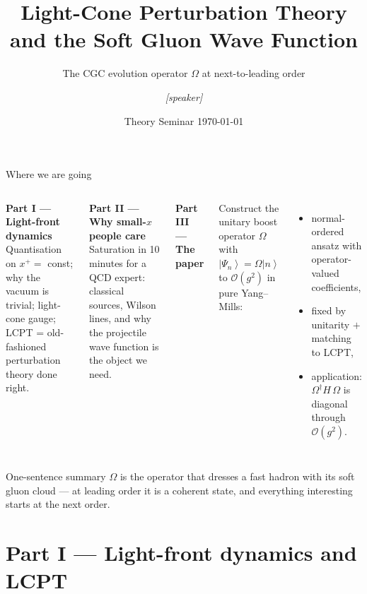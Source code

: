 \documentclass[9pt,aspectratio=169]{beamer}
\title{Light-Cone Perturbation Theory and the Soft Gluon Wave Function}
\subtitle{The CGC evolution operator $\Omega$ at next-to-leading order}
\date{Theory Seminar \quad\textbullet\quad \today}
\author{\textit{[speaker]}}
\institute{based on \textbf{R.~Radhakrishnan}, \texttt{arXiv:2607.18373} (JHEP submission)}
\newcommand{\hl}[1]{\textcolor{acc}{#1}}
\newcommand{\xp}{x^{+}}
\newcommand{\Om}{\Omega}
\newcommand{\ket}[1]{\left|#1\right\rangle}
\begin{document}
\maketitle

\begin{frame}{Where we are going}
\begin{columns}[T,onlytextwidth]
\textbf{Part I --- Light-front dynamics}\\[2pt]
{\small Quantisation on $\xp=$ const; why the vacuum is trivial;
light-cone gauge; \hl{LCPT} = old-fashioned perturbation theory done right.}
\medskip

\textbf{Part II --- Why small-$x$ people care}\\[2pt]
{\small Saturation in 10 minutes for a QCD expert: classical sources,
Wilson lines, and why the \hl{projectile wave function} is the object we need.}

\textbf{Part III --- The paper}\\[2pt]
{\small Construct the unitary boost operator $\Om$ with
$\ket{\Psi_n}=\Om\ket{n}$ to $\mathcal{O}(g^2)$ in pure Yang--Mills:
\begin{itemize}\small
  \item normal-ordered ansatz with \hl{operator-valued} coefficients,
  \item fixed by \hl{unitarity} $+$ \hl{matching to LCPT},
  \item application: $\Om^\dagger H\,\Om$ is diagonal through $\mathcal{O}(g^2)$.
\end{itemize}}
\end{columns}
\vfill
\begin{alertblock}{One-sentence summary}
$\Om$ is the operator that dresses a fast hadron with its soft gluon cloud ---
at leading order it is a coherent state, and \hl{everything interesting starts
at the next order}.
\end{alertblock}
\end{frame}

\section{Part I --- Light-front dynamics and LCPT}
\end{document}

